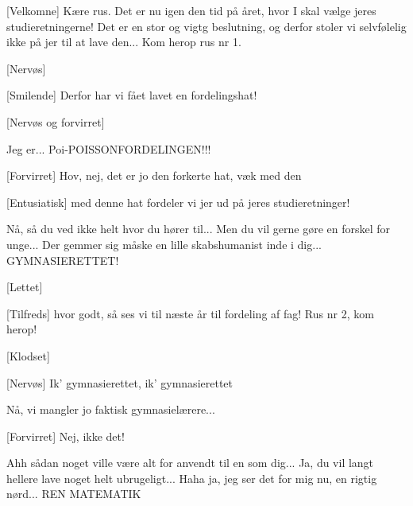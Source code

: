 \documentclass[a4paper,11pt]{article}
\begin{document}
\begin{sketch}

[Velkomne] Kære rus. Det er nu igen den tid på året, hvor I skal vælge jeres studieretningerne! Det er en stor og vigtg beslutning, og derfor stoler vi selvfølelig ikke på jer til at lave den... Kom herop rus nr 1.

[Nervøs] 

[Smilende] Derfor har vi fået lavet en fordelingshat! 

[Nervøs og forvirret] 

 Jeg er... Poi-POISSONFORDELINGEN!!!

[Forvirret] Hov, nej, det er jo den forkerte hat, væk med den 

[Entusiatisk] med denne hat fordeler vi jer ud på jeres studieretninger! 

 Nå, så du ved ikke helt hvor du hører til... Men du vil gerne gøre en forskel for unge... Der gemmer sig måske en lille skabshumanist inde i dig... GYMNASIERETTET!

[Lettet] 

[Tilfreds]  hvor godt, så ses vi til næste år til fordeling af fag! Rus nr 2, kom herop!

[Klodset] 

[Nervøs]  Ik' gymnasierettet, ik' gymnasierettet

 Nå, vi mangler jo faktisk gymnasielærere...

[Forvirret] Nej, ikke det!

 Ahh sådan noget ville være alt for anvendt til en som dig... Ja, du vil langt hellere lave noget helt ubrugeligt... Haha ja, jeg ser det for mig nu, en rigtig nørd... REN MATEMATIK


\end{sketch}
\end{document}
